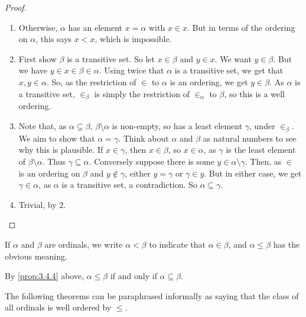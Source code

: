 \begin{proof}
\hfill
\begin{enumerate}
\item Otherwise, $ \alpha $ has an element $ x = \alpha $ with $ x \in x $. But in terms of the ordering on $ \alpha $, this says $ x < x $, which is impossible.
\item First show $ \beta $ is a transitive set. So let $ x \in \beta $ and $ y \in x $. We want $ y \in \beta $. But we have $ y \in x \in \beta \in \alpha $. Using twice that $ \alpha $ is a transitive set, we get that $ x, y \in \alpha $. So, as the restriction of $ \in $ to $ \alpha $ is an ordering, we get $ y \in \beta $. As $ \alpha $ is a transitive set, $ \in_\beta $ is simply the restriction of $ \in_\alpha $ to $ \beta $, so this is a well ordering.

\pagebreak

\item Note that, as $ \alpha \subsetneq \beta $, $ \beta \setminus \alpha $ is non-empty, so has a least element $ \gamma $, under $ \in_\beta $. We aim to show that $ \alpha = \gamma $. Think about $ \alpha $ and $ \beta $ as natural numbers to see why this is plausible. If $ x \in \gamma $, then $ x \in \beta $, so $ x \in \alpha $, as $ \gamma $ is the least element of $ \beta \setminus \alpha $. Thus $ \gamma \subseteq \alpha $. Conversely suppose there is some $ y \in \alpha \setminus \gamma $. Then, as $ \in $ is an ordering on $ \beta $ and $ y \notin \gamma $, either $ y = \gamma $ or $ \gamma \in y $. But in either case, we get $ \gamma \in \alpha $, as $ \alpha $ is a transitive set, a contradiction. So $ \alpha \subseteq \gamma $.
\item Trivial, by $ 2 $.
\end{enumerate}
\end{proof}

\begin{definition}
If $ \alpha $ and $ \beta $ are ordinals, we write $ \alpha < \beta $ to indicate that $ \alpha \in \beta $, and $ \alpha \le \beta $ has the obvious meaning.
\end{definition}

\begin{note*}
By \ref{prop:3.4.4} above, $ \alpha \le \beta $ if and only if $ \alpha \subseteq \beta $.
\end{note*}

The following theorems can be paraphrased informally as saying that the class of all ordinals is well ordered by $ \le $.

